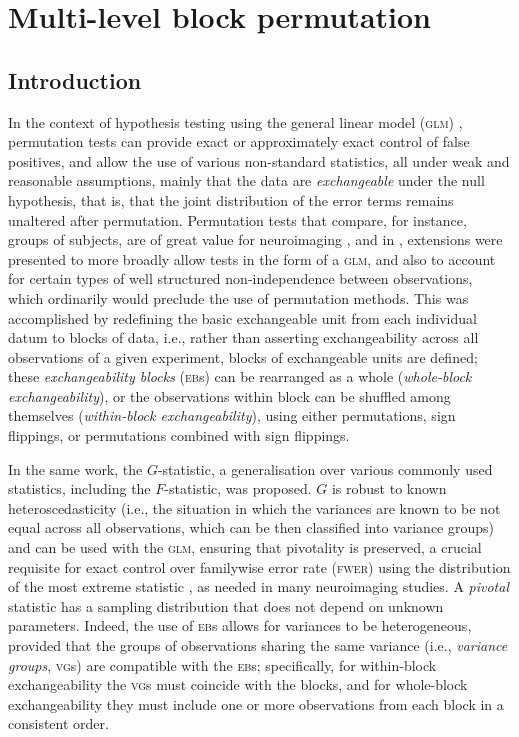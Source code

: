 \chapter{Multi-level block permutation}
\label{sec:ptree}
\setstretch{\lspac}

\section{Introduction}

In the context of hypothesis testing using the general linear model (\textsc{glm}) \citep{Scheffe1959, Searle1971}, permutation tests can provide exact or approximately exact control of false positives, and allow the use of various non-standard statistics, all under weak and reasonable assumptions, mainly that the data are \emph{exchangeable} under the null hypothesis, that is, that the joint distribution of the error terms remains unaltered after permutation. Permutation tests that compare, for instance, groups of subjects, are of great value for neuroimaging \citep{Holmes1996, Nichols2002}, and in \citet{Winkler2014}, extensions were presented to more broadly allow tests in the form of a \textsc{glm}, and also to account for certain types of well structured non-independence between observations, which ordinarily would preclude the use of permutation methods. This was accomplished by redefining the basic exchangeable unit from each individual datum to blocks of data, i.e., rather than asserting exchangeability across all observations of a given experiment, blocks of exchangeable units are defined; these \emph{exchangeability blocks} (\textsc{eb}s) can be rearranged as a whole (\emph{whole-block exchangeability}), or the observations within block can be shuffled among themselves (\emph{within-block exchangeability}), using either permutations, sign flippings, or permutations combined with sign flippings.

In the same work, the $G$-statistic, a generalisation over various commonly used statistics, including the $F$-statistic, was proposed. $G$ is robust to known heteroscedasticity (i.e., the situation in which the variances are known to be not equal across all observations, which can be then classified into variance groups) and can be used with the \textsc{glm}, ensuring that pivotality is preserved, a crucial requisite for exact control over familywise error rate (\textsc{fwer}) using the distribution of the most extreme statistic \citep{Westfall1993}, as needed in many neuroimaging studies. A \emph{pivotal} statistic has a sampling distribution that does not depend on unknown parameters. Indeed, the use of \textsc{eb}s allows for variances to be heterogeneous, provided that the groups of observations sharing the same variance (i.e., \emph{variance groups}, \textsc{vg}s) \citep{Woolrich2004} are compatible with the \textsc{eb}s; specifically, for within-block exchangeability the \textsc{vg}s must coincide with the blocks, and for whole-block exchangeability they must include one or more observations from each block in a consistent order.

